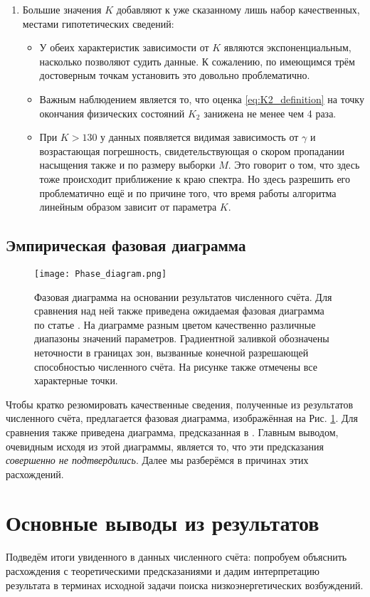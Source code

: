 \begin{enumerate}
	\item Большие значения $K$ добавляют к уже сказанному лишь набор качественных, местами гипотетических сведений:
	\begin{itemize}
		\item У обеих характеристик зависимости от $K$ являются экспоненциальным, насколько позволяют судить данные. К сожалению, по имеющимся трём достоверным точкам установить это довольно проблематично.
		\item Важным наблюдением является то, что оценка \eqref{eq:K2_definition} на точку окончания физических состояний $K_2$ занижена не менее чем 4 раза.
		\item При $K > 130$ у данных появляется видимая зависимость от $\gamma$ и возрастающая погрешность, свидетельствующая о скором пропадании насыщения также и по размеру выборки $M$. Это говорит о том, что здесь тоже происходит приближение к краю спектра. Но здесь разрешить его проблематично ещё и по причине того, что время работы алгоритма линейным образом зависит от параметра $K$.
	\end{itemize}
\end{enumerate}


\subsection{Эмпирическая фазовая диаграмма}

\begin{figure}[h!]
	\label{fig:Phase_diagram}
	\centering
	\texttt{[image: Phase\_diagram.png]}
	\caption{Фазовая диаграмма на основании результатов численного счёта. Для сравнения над ней также приведена ожидаемая фазовая диаграмма по статье \cite{FI_microwave}. На диаграмме разным цветом качественно различные диапазоны значений параметров. Градиентной заливкой обозначены неточности в границах зон, вызванные конечной разрешающей способностью численного счёта. На рисунке также отмечены все характерные точки.}
\end{figure}

Чтобы кратко резюмировать качественные сведения, полученные из результатов численного счёта, предлагается фазовая диаграмма, изображённая на Рис. \ref{fig:Phase_diagram}. Для сравнения также приведена диаграмма, предсказанная в \cite{FI_microwave}. Главным выводом, очевидным исходя из этой диаграммы, является то, что эти предсказания \textit{совершенно не подтвердились}. Далее мы разберёмся в причинах этих расхождений.


\section{Основные выводы из результатов}
Подведём итоги увиденного в данных численного счёта: попробуем объяснить расхождения с теоретическими предсказаниями и дадим интерпретацию результата в терминах исходной задачи поиска низкоэнергетических возбуждений.


